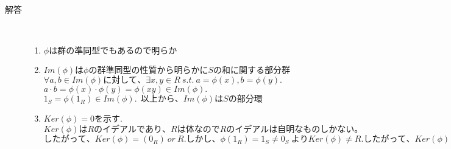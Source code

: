 \documentclass[dvipdfmx]{jsarticle}
\begin{document}
\begin{description}
  \item[解答]　\mbox{}\\
  \begin{enumerate}
    \item $\phi は群の準同型でもあるので明らか$
    \item $Im(\phi)は \phi の群準同型の性質から明らかにSの和に関する部分群$\\
    $\forall a,b \in Im(\phi) に対して、\exists x,y \in R \ s.t. \ a = \phi(x), b = \phi(y).$ \\
    $ a \cdot b = \phi(x) \cdot \phi(y) = \phi(xy) \in Im(\phi).$\\
    $1_S = \phi(1_R) \in Im(\phi). \ \ 以上から、Im(\phi)はSの部分環$

    \item $Ker(\phi) = {0}を示す.$\\
    $Ker(\phi)はRのイデアルであり、Rは体なのでRのイデアルは自明なものしかない。$\\
    $したがって、Ker(\phi) = (0_R) \ or \ R.しかし、\phi(1_R) = 1_S \neq 0_S \ よりKer(\phi) \neq R.したがって、Ker(\phi) = (0_R). $
  \end{enumerate}
\end{description}
\end{document}
